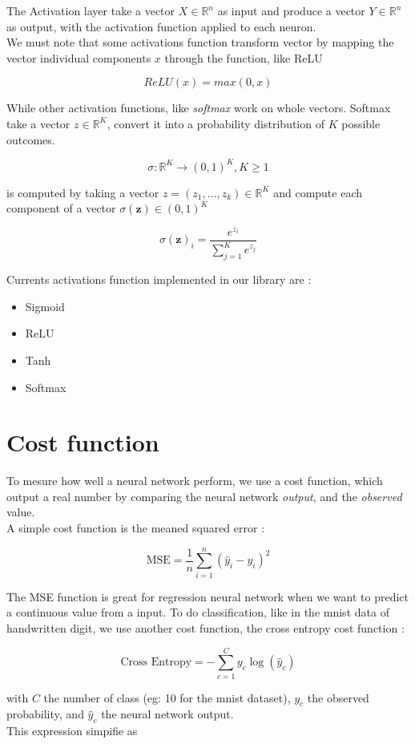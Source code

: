 \documentclass[a4paper, twocolumn, twoside]{article}
\begin{document}
	The Activation layer take a vector $X \in \mathbb{R}^n$  as input and produce a vector $Y \in \mathbb{R}^n $ as output,
	with the activation function applied to each neuron.\\
	We must note that some activations function transform vector by
	mapping the vector individual components $x$ through the function, like ReLU

	$$
	ReLU(x) = max(0, x)
	$$

	While other activation functions, like \textit{softmax} work on whole vectors.
	Softmax take a vector $z \in \mathbb{R}^K$,
	convert it into a probability distribution of $K$ possible outcomes.

	$$
	\sigma : \mathbb{R}^{K} \rightarrow (0, 1)^K, K \geq 1
	$$

	is computed by taking a vector $z = (z_1, ..., z_k) \in \mathbb{R}^K$ and compute each component of a vector $\sigma(\mathbf{z}) \in (0, 1)^K$ 

	$$
	\sigma(\mathbf{z})_i = \frac{e^{z_i}}{\sum_{j = 1}^{K} e^{z_j}}
	$$

	Currents activations function implemented in our library are :
	\begin{itemize}
		\item{Sigmoid}
		\item{ReLU}
		\item{Tanh}
		\item{Softmax}
	\end{itemize}

	\section{Cost function}
	To mesure how well a neural network perform, we use a cost function, 
	which output a real number
	by comparing the neural network \textit{output}, 
	and the \textit{observed} value.\\
	A simple cost function is the meaned squared error :

	$$
	\text{MSE} = \frac{1}{n} \sum_{i=1}^{n} (\hat{y}_i - y_i)^2
	$$

	The MSE function is great for regression neural network when we want to predict a continuous value from a input.
	To do classification, like in the mnist data of handwritten digit,
	we use another cost function,
	the cross entropy cost function :

	$$
		\text{Cross Entropy} = -\sum_{c=1}^{C} y_{c} \log(\hat{y}_{c})
	$$

	with $C$ the number of class (eg: 10 for the mnist dataset), $y_{c}$ 
	the observed probability, and $\hat{y}_{c}$ the neural network output.\\
	This expression simpifie as
\end{document}

